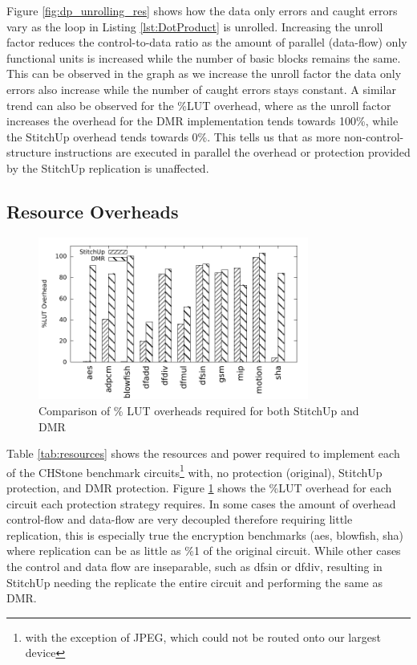 Figure \ref{fig:dp_unrolling_res} shows how the data only errors and caught errors vary as the loop in Listing \ref{lst:DotProduct}
is unrolled.
Increasing the unroll factor reduces the control-to-data ratio as the amount of parallel (data-flow) only functional units is increased
while the number of basic blocks remains the same.
This can be observed in the graph as we increase the unroll factor the data only errors also increase while the number of caught errors
stays constant.
A similar trend can also be observed for the \%LUT overhead, where as the unroll factor increases the overhead for the DMR implementation
tends towards 100\%, while the StitchUp overhead tends towards 0\%.
This tells us that as more non-control-structure instructions are executed in parallel the overhead or
protection provided by the StitchUp replication is unaffected.

\subsection{Resource Overheads}
\renewcommand{\arraystretch}{0.8}

\begin{figure}[h]
\centering
\includegraphics[width=3.5in]{./graphs/luts_res.pdf}
\caption{Comparison of \% LUT overheads required for both StitchUp and DMR}
\label{fig:lut_res}
\end{figure}

Table \ref{tab:resources} shows the resources and power required to implement each of the CHStone benchmark circuits\footnote{with the exception of JPEG, which could not be routed onto our largest device}
with, no protection (original), StitchUp protection, and DMR protection.
Figure \ref{fig:lut_res} shows the \%LUT overhead for each circuit each protection strategy requires.
In some cases the amount of overhead control-flow and data-flow are very decoupled therefore requiring little replication, this is especially true
the encryption benchmarks (aes, blowfish, sha) where replication can be as little as \%1 of the original circuit.
While other cases the control and data flow are inseparable, such as dfsin or dfdiv, resulting in StitchUp needing the replicate
the entire circuit and performing the same as DMR.

